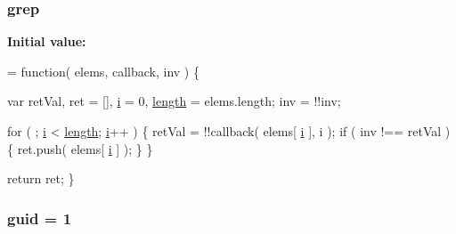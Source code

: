 \subsubsection[{grep}]{ grep}\label{jquery-1_810_82-vsdoc_8js_ae68047c53cf0b4906eb8f3256d860435}
{\bfseries Initial value\+:}
\begin{DoxyCode}
= \textcolor{keyword}{function}( elems, callback, inv ) \{


        var retVal,
            ret = [],
            \hyperlink{_bibabook_2_scripts_2respond_8min_8js_a5e25b1d1bed9ab5f3174b76d6a722180}{i} = 0,
            \hyperlink{jquery-1_810_82-vsdoc_8js_aa7de35d58da66d9944ab9cbe82c19640}{length} = elems.length;
        inv = !!inv;

        
        
        \textcolor{keywordflow}{for} ( ; \hyperlink{_bibabook_2_scripts_2respond_8min_8js_a5e25b1d1bed9ab5f3174b76d6a722180}{i} < \hyperlink{jquery-1_810_82-vsdoc_8js_aa7de35d58da66d9944ab9cbe82c19640}{length}; \hyperlink{_bibabook_2_scripts_2respond_8min_8js_a5e25b1d1bed9ab5f3174b76d6a722180}{i}++ ) \{
            retVal = !!callback( elems[ \hyperlink{_bibabook_2_scripts_2respond_8min_8js_a5e25b1d1bed9ab5f3174b76d6a722180}{i} ], i );
            \textcolor{keywordflow}{if} ( inv !== retVal ) \{
                ret.push( elems[ \hyperlink{_bibabook_2_scripts_2respond_8min_8js_a5e25b1d1bed9ab5f3174b76d6a722180}{i} ] );
            \}
        \}

        \textcolor{keywordflow}{return} ret;
    \}
\end{DoxyCode}
\hypertarget{jquery-1_810_82-vsdoc_8js_a15bc7663c428889bacadc7aec13400cc}{}
\subsubsection[{guid}]{ guid = 1}\label{jquery-1_810_82-vsdoc_8js_a15bc7663c428889bacadc7aec13400cc}
\hypertarget{jquery-1_810_82-vsdoc_8js_a3976525435f2cc0ddbdfd1fd4fa719ec}{}
